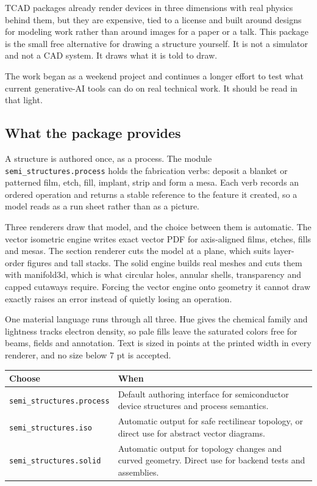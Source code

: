\documentclass[11pt]{article}
\newcommand{\packagefile}[1]{\texttt{#1}}
\begin{document}
TCAD packages already render devices in three dimensions with real physics
behind them, but they are expensive, tied to a license and built around
designs for modeling work rather than around images for a paper or a talk.
This package is the small free alternative for drawing a structure yourself.
It is not a simulator and not a CAD system. It draws what it is told to draw.

The work began as a weekend project and continues a longer effort to test
what current generative-AI tools can do on real technical work. It should be
read in that light.

\subsection*{What the package provides}

A structure is authored once, as a process. The module
\packagefile{semi\_structures.process} holds the fabrication verbs: deposit a
blanket or patterned film, etch, fill, implant, strip and form a mesa. Each
verb records an ordered operation and returns a stable reference to the
feature it created, so a model reads as a run sheet rather than as a picture.

Three renderers draw that model, and the choice between them is automatic.
The vector isometric engine writes exact vector PDF for axis-aligned films,
etches, fills and mesas. The section renderer cuts the model at a plane, which
suits layer-order figures and tall stacks. The solid engine builds real meshes
and cuts them with manifold3d, which is what circular holes, annular shells,
transparency and capped cutaways require. Forcing the vector engine onto
geometry it cannot draw exactly raises an error instead of quietly losing an
operation.

One material language runs through all three. Hue gives the chemical family
and lightness tracks electron density, so pale fills leave the saturated
colors free for beams, fields and annotation. Text is sized in points at the
printed width in every renderer, and no size below 7 pt is accepted.

\begin{center}
\begin{tabular}{>{\raggedright\arraybackslash}p{}
                >{\raggedright\arraybackslash}p{}}
  \toprule
  \textbf{Choose} & \textbf{When} \\
  \midrule
  \packagefile{semi\_structures.process} & Default authoring interface for
    semiconductor device structures and process semantics. \\
  \packagefile{semi\_structures.iso} & Automatic output for safe rectilinear
    topology, or direct use for abstract vector diagrams. \\
  \packagefile{semi\_structures.solid} & Automatic output for topology changes
    and curved geometry. Direct use for backend tests and assemblies. \\
  \bottomrule
\end{tabular}
\end{center}
\end{document}
